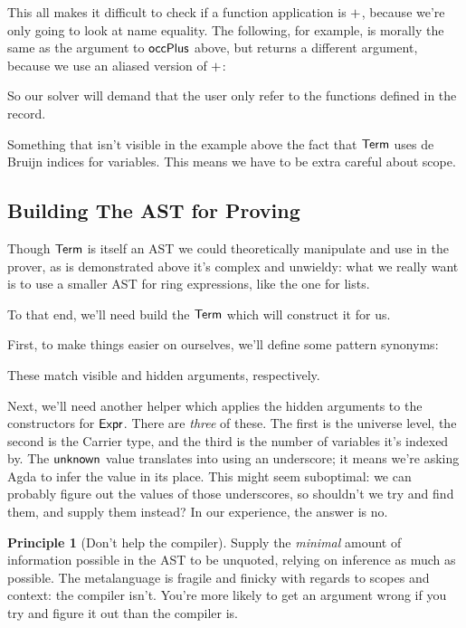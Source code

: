 \documentclass[draft, twocolumn]{article}
\theoremstyle{definition}
\theoremstyle{definition}
\newtheorem{principle}{Principle}[section]
\begin{document}
This all makes it difficult to check if a function application is
\(\AgdaFunction{+}\), because we're only going to look at name equality. The
following, for example, is morally the same as the argument to
\(\AgdaMacro{occPlus}\) above, but returns a different argument, because we use
an aliased version of \(\AgdaFunction{+}\):

So our solver will demand that the user only refer to the functions defined in
the record.

Something that isn't visible in the example above the fact that
\(\AgdaDatatype{Term}\) uses de Bruijn indices for variables. This means we have
to be extra careful about scope.

\subsection{Building The AST for Proving}
Though \(\AgdaDatatype{Term}\) is itself an AST we could theoretically
manipulate and use in the prover, as is demonstrated above it's complex and
unwieldy: what we really want is to use a smaller AST for ring expressions, like
the one for lists.

To that end, we'll need build the \(\AgdaDatatype{Term}\) which will construct
it for us.

First, to make things easier on ourselves, we'll define some pattern synonyms:

These match visible and hidden arguments, respectively.

Next, we'll need another helper which applies the hidden arguments to the
constructors for \(\AgdaDatatype{Expr}\). There are \emph{three} of these. The
first is the universe level, the second is the Carrier type, and the third is
the number of variables it's indexed by.
The \(\AgdaInductiveConstructor{unknown}\) value translates into using an
underscore; it means we're asking Agda to infer the value in its place. This
might seem suboptimal: we can probably figure out the values of those
underscores, so shouldn't we try and find them, and supply them instead? In our
experience, the answer is no.

\begin{principle}[Don't help the compiler]
  Supply the \emph{minimal} amount of information possible in the AST to be
  unquoted, relying on inference as much as possible. The metalanguage is
  fragile and finicky with regards to scopes and context: the compiler isn't.
  You're more likely to get an argument wrong if you try and figure it out than
  the compiler is.
\end{principle}
\end{document}
